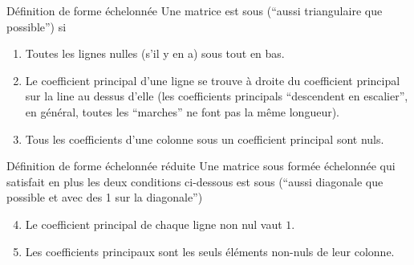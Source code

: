 \documentclass{article}
\begin{document}
\begin{parag}{Définition de forme échelonnée}
    Une matrice est sous  (``aussi triangulaire que possible'') si
    \begin{enumerate}
        \item Toutes les lignes nulles (s'il y en a) sous tout en bas.
        \item Le coefficient principal d'une ligne se trouve à droite du coefficient principal sur la line au dessus d'elle (les coefficients principals ``descendent en escalier'', en général, toutes les ``marches'' ne font pas la même longueur).
        \item Tous les coefficients d'une colonne sous un coefficient principal sont nuls.
    \end{enumerate}

\end{parag}

\begin{parag}{Définition de forme échelonnée réduite}
    Une matrice sous formée échelonnée qui satisfait en plus les deux conditions ci-dessous est sous   (``aussi diagonale que possible et avec des 1 sur la diagonale'')
    \begin{enumerate}
        \setcounter{enumi}{3}
        \item Le coefficient principal de chaque ligne non nul vaut $1$.
        \item Les coefficients principaux sont les seuls éléments non-nuls de leur colonne.
    \end{enumerate}

\end{parag}
\end{document}
